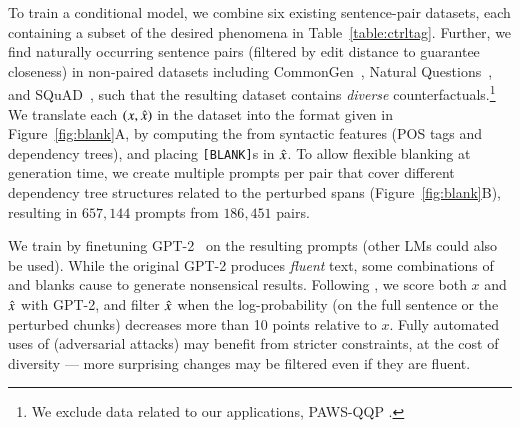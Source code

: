 

To train a conditional model, we combine six existing sentence-pair datasets, each containing a subset of the desired phenomena in Table~\ref{table:ctrltag}. 
Further, we find naturally occurring sentence pairs (filtered by edit distance to guarantee closeness) in non-paired datasets including CommonGen~\cite{lin-etal-2020-commongen}, Natural Questions~\cite{kwiatkowski-etal-2019-natural}, and SQuAD~\cite{rajpurkar-etal-2016-squad}, such that the resulting dataset contains \emph{diverse} counterfactuals.\footnote{We exclude data related to our applications, \eg PAWS-QQP \cite{zhang2019paws}. }
We translate each $(x, \hat{x})$ in the dataset into the format given in Figure~\ref{fig:blank}A, by computing the \tagstr from syntactic features (POS tags and dependency trees), and placing \texttt{[BLANK]}s in $\hat{x}$. 
To allow flexible blanking at generation time, we create multiple prompts per pair that cover  different dependency tree structures related to the perturbed spans (Figure~\ref{fig:blank}B), resulting in $657,144$ prompts from $186,451$ pairs.

We train \sysname by finetuning GPT-2~\cite{radford2019language} on the resulting prompts (other LMs could also be used).
While the original GPT-2 produces \emph{fluent} text, some combinations of \tagstrs and blanks cause \sysname to generate nonsensical results.
Following \citet{morris2020textattack}, we score both $x$ and $\hat{x}$ with GPT-2, and filter $\hat{x}$ when the log-probability (on the full sentence or the perturbed chunks) decreases more than 10 points relative to $x$.
Fully automated uses of \sysname (\eg adversarial attacks) may benefit from stricter constraints, at the cost of diversity --- more surprising changes may be filtered even if they are fluent.


